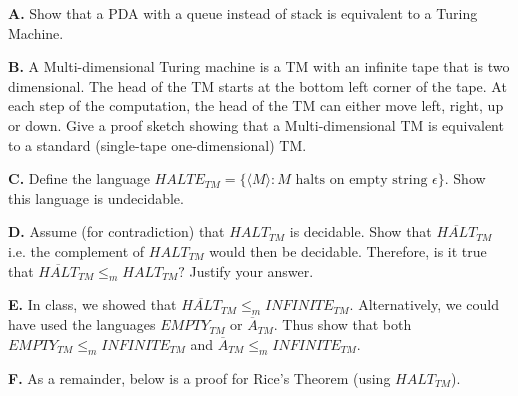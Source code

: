 \documentclass[10pt]{article}
\begin{document}
\noindent
\textbf{A. }Show that a PDA with a queue instead of stack is equivalent to a Turing Machine.

\newpage

\noindent
\textbf{B. }A Multi-dimensional Turing machine is a TM with an infinite tape that is two dimensional. The head of the TM starts at the bottom left corner of the tape. At each step of the computation, the head of the TM can either move left, right, up or down. Give a proof sketch showing that a Multi-dimensional TM is equivalent to a standard (single-tape one-dimensional) TM.



\newpage

\noindent
\textbf{C. }Define the language $\textit{HALTE}_{TM}=\{\langle M\rangle: M \text{ halts on empty string }\epsilon\}$. Show this language is undecidable.\\


\newpage

\noindent
\textbf{D. } Assume (for contradiction) that $\textit{HALT}_{TM}$ is decidable. Show that $\overline{\textit{HALT}}_{TM}$ i.e. the complement of $\textit{HALT}_{TM}$ would then be decidable. Therefore, is it true that $\overline{\textit{HALT}}_{TM}\le_m \textit{HALT}_{TM}?$ Justify your answer. \\

\newpage



\noindent
\textbf{E. } In class, we showed that $\overline{\textit{HALT}}_{TM} \le_m \textit{INFINITE}_{TM}$. Alternatively, we could have used the languages $\textit{EMPTY}_{TM}$ or $\overline{A}_{TM}.$ Thus show that both $\textit{EMPTY}_{TM} \le_m \textit{INFINITE}_{TM}$ and $\overline{A}_{TM}\le_m \textit{INFINITE}_{TM}.$\\




\newpage

\noindent
\textbf{F. }As a remainder, below is a proof for Rice's Theorem (using $\textit{HALT}_{TM}$).
\end{document}
